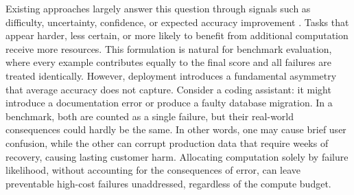 \documentclass{article}
\begin{document}
Existing approaches largely answer this question through signals such as difficulty, uncertainty, confidence, or expected accuracy improvement \citep{snell2024scaling,damani2024learning,manvi2024adaptive,qu2026adaptivetesttime}. Tasks that appear harder, less certain, or more likely to benefit from additional computation receive more resources. This formulation is natural for benchmark evaluation, where every example contributes equally to the final score and all failures are treated identically. However, deployment introduces a fundamental asymmetry that average accuracy does not capture. Consider a coding assistant: it might introduce a documentation error or produce a faulty database migration. In a benchmark, both are counted as a single failure, but their real-world consequences could hardly be the same. In other words, one may cause brief user confusion, while the other can corrupt production data that require weeks of recovery, causing lasting customer harm. Allocating computation solely by failure likelihood, without accounting for the consequences of error, can leave preventable high-cost failures unaddressed, regardless of the compute budget. 
\end{document}
